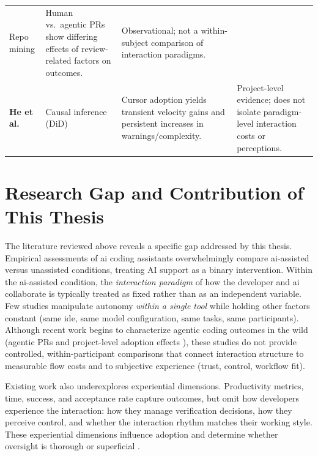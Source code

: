 \begin{table}[H]
\begin{tabularx}{\textwidth}{>{\raggedright\arraybackslash}p{2.8cm} >{\raggedright\arraybackslash}p{2cm} X >{\raggedright\arraybackslash}p{4cm}}
    Repo mining &

    Human vs.\ agentic PRs show differing effects of review-related factors on outcomes. &

    Observational; not a within-subject comparison of interaction paradigms. \\

    \textbf{He et al.} \parencite{he2025cursorDID} &

    Causal inference (DiD) &

    Cursor adoption yields transient velocity gains and persistent increases in warnings/complexity. &

    Project-level evidence; does not isolate paradigm-level interaction costs or perceptions. \\

    \bottomrule

  \end{tabularx}

\end{table}


\section{Research Gap and Contribution of This Thesis}

\label{sec:rw-gap}

The literature reviewed above reveals a specific gap addressed by this thesis. Empirical assessments of \gls{ai} coding assistants overwhelmingly compare \gls{ai}-assisted versus unassisted conditions, treating AI support as a binary intervention. Within the \gls{ai}-assisted condition, the \emph{interaction paradigm} of how the developer and \gls{ai} collaborate is typically treated as fixed rather than as an independent variable. Few studies manipulate autonomy \emph{within a single tool} while holding other factors constant (same \gls{ide}, same model configuration, same tasks, same participants). Although recent work begins to characterize agentic coding outcomes in the wild (agentic PRs \parencite{watanabe2025agenticPR, yoshioka2026meaningfulPR} and project-level adoption effects \parencite{he2025cursorDID}), these studies do not provide controlled, within-participant comparisons that connect interaction structure to measurable flow costs and to subjective experience (trust, control, workflow fit).

Existing work also underexplores experiential dimensions. Productivity metrics, time, success, and acceptance rate capture outcomes, but omit how developers experience the interaction: how they manage verification decisions, how they perceive control, and whether the interaction rhythm matches their working style. These experiential dimensions influence adoption and determine whether oversight is thorough or superficial \parencite{barke2023trust, leeSee2004trust}.

